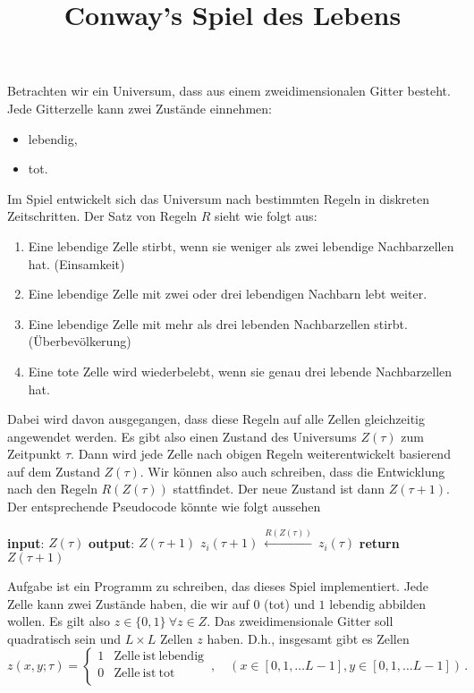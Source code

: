 \documentclass{article}[12pt]
\title{Conway's Spiel des Lebens}
\begin{document}
\maketitle


\noindent Betrachten wir ein \glqq Universum\grqq, dass aus einem zweidimensionalen Gitter besteht.
Jede Gitterzelle kann zwei Zustände einnehmen:
\begin{itemize}
\item lebendig,
\item tot.
\end{itemize}
Im Spiel entwickelt sich das Universum nach bestimmten Regeln in diskreten Zeitschritten.
Der Satz von Regeln $R$ sieht wie folgt aus:
\begin{enumerate}
\item Eine lebendige Zelle stirbt, wenn sie weniger als zwei lebendige
  Nachbarzellen hat. (Einsamkeit)
\item Eine lebendige Zelle mit zwei oder drei lebendigen Nachbarn lebt
  weiter. 
\item Eine lebendige Zelle mit mehr als drei lebenden Nachbarzellen
  stirbt. (Überbevölkerung)
\item Eine tote Zelle wird wiederbelebt, wenn sie genau drei lebende Nachbarzellen hat.
\end{enumerate}
Dabei wird davon ausgegangen, dass diese Regeln auf alle Zellen gleichzeitig angewendet werden.
Es gibt also einen Zustand des Universums $Z(\tau)$ zum Zeitpunkt $\tau$.
Dann wird jede Zelle nach obigen Regeln weiterentwickelt basierend auf dem Zustand $Z(\tau)$.
Wir können also auch schreiben, dass die Entwicklung nach den Regeln $R(Z(\tau))$ stattfindet. 
Der neue Zustand ist dann $Z(\tau+1)$. 
Der entsprechende Pseudocode könnte wie folgt aussehen
\begin{algorithmic}[1]
  \State \textbf{input}: $Z(\tau)$
  \State \textbf{output}: $Z(\tau+1)$
  \State $z_i(\tau+1)\ \stackrel{R(Z(\tau))}{\longleftarrow}\ z_i(\tau)$
  \EndFor
  \State \textbf{return} $Z(\tau+1)$
  \EndProcedure
\end{algorithmic}
Aufgabe ist ein Programm zu schreiben, das dieses Spiel implementiert.
Jede Zelle kann zwei Zustände haben, die wir auf $0$ (tot) und $1$ lebendig abbilden wollen.
Es gilt also $z \in \{0,1\}\ \forall z\in Z$.
Das zweidimensionale Gitter soll quadratisch sein und $L\times L$ Zellen $z$ haben.
D.h., insgesamt gibt es Zellen
\begin{equation}
  z(x,y; \tau) = \begin{cases}
    1 & \mathrm{Zelle~ist~lebendig} \\0  & \mathrm{Zelle~ist~tot} \\
  \end{cases}
  \,,\quad (x\in[0,1,\ldots L-1], y\in[0,1,\ldots L-1])\,.
\end{equation}
\end{document}
